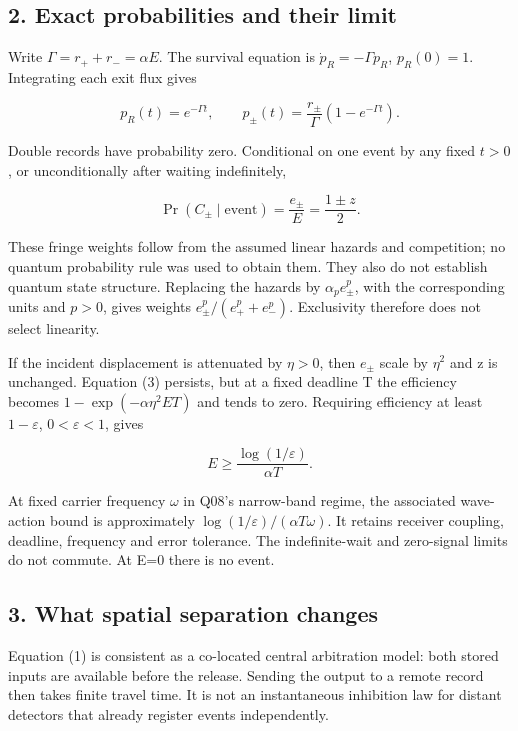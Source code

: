 \documentclass[11pt,a4paper]{article}
\begin{document}
\hypertarget{exact-probabilities-and-their-limit}{%
\subsection{2. Exact probabilities and their
limit}\label{exact-probabilities-and-their-limit}}

Write \(\Gamma=r_++r_-=\alpha E\). The survival equation is
\(\dot p_R=-\Gamma p_R\), \(p_R(0)=1\). Integrating each exit flux gives

\[p_R(t)=e^{-\Gamma t},\qquad
p_\pm(t)=\frac{r_\pm}{\Gamma}(1-e^{-\Gamma t}). \tag{2}\]

Double records have probability zero. Conditional on one event by any
fixed \(t>0\), or unconditionally after waiting indefinitely,

\[\Pr(C_\pm\mid\text{event})=\frac{e_\pm}{E}=\frac{1\pm z}{2}. \tag{3}\]

These fringe weights follow from the assumed linear hazards and
competition; no quantum probability rule was used to obtain them. They
also do not establish quantum state structure. Replacing the hazards by
\(\alpha_p e_\pm^p\), with the corresponding units and \(p>0\), gives
weights \(e_\pm^p/(e_+^p+e_-^p)\). Exclusivity therefore does not select
linearity.

If the incident displacement is attenuated by \(\eta>0\), then \(e_\pm\)
scale by \(\eta^2\) and z is unchanged. Equation (3) persists, but at a
fixed deadline T the efficiency becomes \(1-\exp(-\alpha\eta^2ET)\) and
tends to zero. Requiring efficiency at least \(1-\varepsilon\),
\(0<\varepsilon<1\), gives

\[E\ge\frac{\log(1/\varepsilon)}{\alpha T}. \tag{4}\]

At fixed carrier frequency \(\omega\) in Q08's narrow-band regime, the
associated wave-action bound is approximately
\(\log(1/\varepsilon)/(\alpha T\omega)\). It retains receiver coupling,
deadline, frequency and error tolerance. The indefinite-wait and
zero-signal limits do not commute. At E=0 there is no event.

\hypertarget{what-spatial-separation-changes}{%
\subsection{3. What spatial separation
changes}\label{what-spatial-separation-changes}}

Equation (1) is consistent as a co-located central arbitration model:
both stored inputs are available before the release. Sending the output
to a remote record then takes finite travel time. It is not an
instantaneous inhibition law for distant detectors that already register
events independently.
\end{document}
